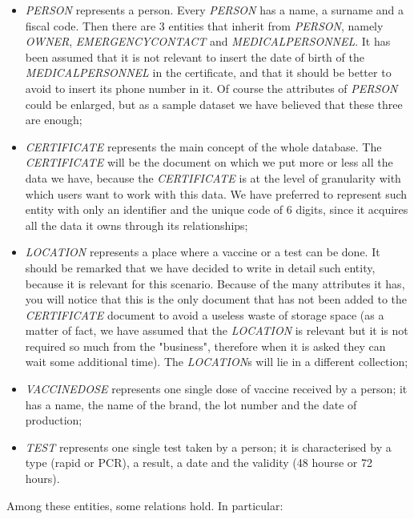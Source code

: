 \documentclass{article}
\begin{document}
\begin{itemize}
    \item \textit{PERSON} represents a person. Every \textit{PERSON} has a name, a surname and a fiscal code. Then there are 3 entities that inherit from \textit{PERSON}, namely \textit{OWNER}, \textit{EMERGENCYCONTACT} and \textit{MEDICALPERSONNEL}. It has been assumed that it is not relevant to insert the date of birth of the \textit{MEDICALPERSONNEL} in the certificate, and that it should be better to avoid to insert its phone number in it. Of course the attributes of \textit{PERSON} could be enlarged, but as a sample dataset we have believed that these three are enough;
    \item \textit{CERTIFICATE} represents the main concept of the whole database. The \textit{CERTIFICATE} will be the document on which we put more or less all the data we have, because the \textit{CERTIFICATE} is at the level of granularity  with which users want to work with this data. We have preferred to represent such entity with only an identifier and the unique code of 6 digits, since it acquires all the data it owns through its relationships;
    \item \textit{LOCATION} represents a place where a vaccine or a test can be done. It should be remarked that we have decided to write in detail such entity, because it is relevant for this scenario. Because of the many attributes it has, you will notice that this is the only document that has not been added to the \textit{CERTIFICATE} document to avoid a useless waste of storage space (as a matter of fact, we have assumed that the \textit{LOCATION} is relevant but it is not required so much from the "business", therefore when it is asked they can wait some additional time). The \textit{LOCATION}s will lie in a different collection;
    \item \textit{VACCINEDOSE} represents one single dose of vaccine received by a person; it has a name, the name of the brand, the lot number and the date of production;
    \item \textit{TEST} represents one single test taken by a person; it is characterised by a type (rapid or PCR), a result, a date and the validity (48 hourse or 72 hours).
\end{itemize}
Among these entities, some relations hold. In particular:
\end{document}
